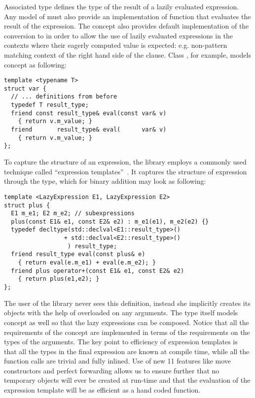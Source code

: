 \noindent
Associated type  defines the type of the result of a lazily 
evaluated expression. Any model of  must also provide an 
implementation of function  that evaluates the result of the 
expression. The concept also provides default implementation of the conversion 
to  in order to allow the use of lazily evaluated expressions 
in the contexts where their eagerly computed value is expected: e.g. non-pattern 
matching context of the right hand side of the  clause. Class 
, for example, models concept  as following:

\begin{lstlisting}
template <typename T>
struct var {
  // ... definitions from before
  typedef T result_type;
  friend const result_type& eval(const var& v) 
    { return v.m_value; }
  friend       result_type& eval(      var& v) 
    { return v.m_value; }
};
\end{lstlisting}

\noindent
To capture the structure of an expression, the library employs a commonly used 
technique called ``expression templates''~\cite{Veldhuizen95expressiontemplates, 
vandevoorde2003c++}. It captures the structure of expression through the type, 
which for binary addition may look as following:

\begin{lstlisting}[keepspaces,columns=flexible]
template <LazyExpression E1, LazyExpression E2>
struct plus {
  E1 m_e1; E2 m_e2; // subexpressions
  plus(const E1& e1, const E2& e2) : m_e1(e1), m_e2(e2) {}
  typedef decltype(std::declval<E1::result_type>() 
                 + std::declval<E2::result_type>()
                  ) result_type;
  friend result_type eval(const plus& e) 
    { return eval(e.m_e1) + eval(e.m_e2); }
  friend plus operator+(const E1& e1, const E2& e2)
    { return plus(e1,e2); }
};
\end{lstlisting}

\noindent
The user of the library never sees this definition, instead she implicitly 
creates its objects with the help of overloaded  on any 
 arguments. The type itself models  
concept as well so that the lazy expressions can be composed. Notice that all 
the requirements of the concept are implemented in terms of the requirements 
on the types of the arguments. The key point to efficiency of expression 
templates is that all the types in the final expression are known at compile 
time, while all the function calls are trivial and fully inlined. Use of new 
\Cpp{}11 features like move constructors and perfect forwarding allows us to 
ensure further that no temporary objects will ever be created at run-time and 
that the evaluation of the expression template will be as efficient as a hand 
coded function.

